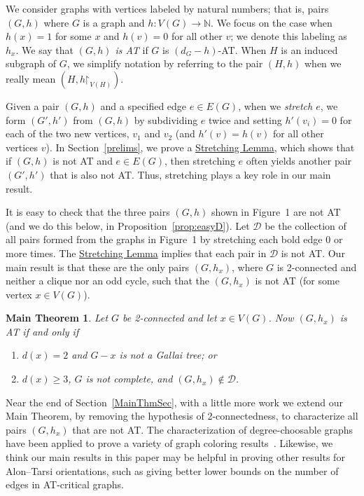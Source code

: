 \documentclass[12pt]{article}
\theoremstyle{plain}
\newtheorem*{mainthm}{Main Theorem}
\theoremstyle{definition}
\theoremstyle{remark}
\newcommand{\fancy}[1]{\mathcal{#1}}
\newcommand{\IN}{\mathbb{N}}
\newcommand{\D}{\fancy{D}}
\newcommand{\func}[3]{#1\colon #2 \rightarrow #3}
\newcommand{\parens}[1]{\left( #1 \right)}
\def\D{\fancy{D}}
\renewcommand{\restriction}{\mathord{\upharpoonright}}
\begin{document}
\bigskip

We consider graphs with vertices labeled by natural numbers; that is, pairs
$(G,h)$ where $G$ is a graph and $\func{h}{V(G)}{\IN}$.  We focus on the case
when $h(x)=1$ for some $x$ and $h(v)=0$ for all other $v$; we denote this
labeling as $h_x$.  We say that \emph{$(G, h)$ is AT} if $G$ is $(d_G - h)$-AT.
 When $H$ is an induced subgraph of $G$, we simplify notation by referring to
the pair $(H, h)$ when we really mean $\parens{H, h\restriction_{V(H)}}$.

Given a pair $(G,h)$ and a specified edge $e\in E(G)$, when we \emph{stretch
$e$}, we form $(G',h')$ from $(G,h)$ by subdividing $e$ twice and setting
$h'(v_i)=0$ for each of the two new vertices, $v_1$ and $v_2$ (and $h'(v)=h(v)$
for all other vertices $v$).  In Section~\ref{prelims}, we prove a
\hyperref[SubdivideTwice]{Stretching Lemma}, which shows that if $(G,h)$ is not
AT and $e\in E(G)$, then stretching $e$ often yields another pair $(G',h')$
that is also not AT.  Thus, stretching plays a key role in our main result.

It is easy to check that the three pairs $(G,h)$ shown in Figure~1 are not AT
(and we do this below, in Proposition~\ref{prop:easyD}).  Let $\D$ be the
collection of all pairs formed from the graphs in Figure~1 by stretching each
bold edge 0 or more times.  The \hyperref[SubdivideTwice]{Stretching Lemma}
implies that each pair in $\D$ is not AT.  Our main result is that these are
the only pairs $(G,h_x)$, where $G$ is 2-connected and neither a clique nor
an odd cycle, such that the $(G,h_x)$ is not AT (for some vertex $x\in V(G)$).  

\begin{mainthm}
Let $G$ be 2-connected and let $x \in V(G)$.
Now $(G,h_x)$ is AT if and only if
\begin{enumerate}
\item $d(x)=2$ and $G-x$ is not a Gallai tree; or
\item $d(x)\ge 3$, $G$ is not complete, and $(G,h_x) \not \in \D$.
\end{enumerate}
\end{mainthm}

Near the end of Section~\ref{MainThmSec}, with a little more work we extend our
Main Theorem, by removing the hypothesis of 2-connectedness, to characterize
all pairs $(G,h_x)$ that are not AT.
The characterization of degree-choosable graphs have been applied
to prove a variety of graph coloring
results~\cite{BohmeMS, CranstonPTV, KostochkaS, KralS, Thomassen-surface}. 
Likewise, we think our main results in this paper may be helpful in proving
other results for Alon--Tarsi orientations, such as giving better lower bounds
on the number of edges in AT-critical graphs.
\end{document}
